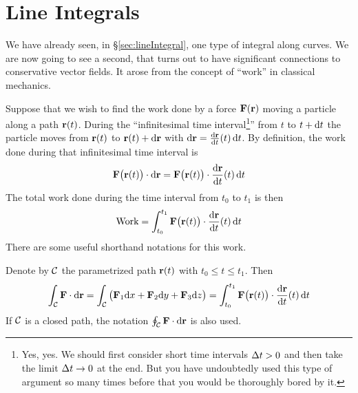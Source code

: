 \section{Line Integrals}\label{sec:workIntegrals}
We have already seen, in \S\ref{sec:lineIntegral}, one type of integral along
curves. We are now going to see a second, that turns out to have significant
connections to conservative vector fields. It arose from the concept of 
``work'' in classical mechanics. 

Suppose that we wish to find the work done
by a force $\mathbf{F}(\mathbf{r})$ moving a particle 
along a path $\mathbf{r}(t)$. During the ``infinitesimal time interval\footnote{Yes, yes. We should first consider short time intervals $\Delta t>0$ and then take the limit 
$\Delta t\rightarrow 0$ at the end. But you have undoubtedly used this 
type of argument so many times before that you would be thoroughly 
bored by it.}'' 
from $t$ to $t+\mathrm{d}t$  the particle moves from $\mathbf{r}(t)$ to $\mathbf{r}(t)+\mathrm{d}\mathbf{r}$ with $\dee{\vr}=\diff{\vr}{t}(t)\,\dee{t}$. By definition, the work done 
during that infinitesimal time interval is 
\begin{equation*}
\vF\big(\vr(t)\big)\cdot\dee{\vr} = \vF\big(\vr(t)\big)\cdot
\diff{\vr}{t}(t)\,\dee{t}
\end{equation*}
The total work done during the time interval from $t_0$ to $t_1$ is then
\begin{equation*}
\text{Work} = \int_{t_0}^{t_1}\vF\big(\vr(t)\big)\cdot\diff{\vr}{t}(t)\,\dee{t}
\end{equation*}
There are some useful shorthand notations for this work.

\begin{notn}\label{not:workIntegral}
Denote by $\mathcal{C}$ the parametrized path $\mathbf{r}(t)$ with $t_0\le t\le t_1$. 
Then
\begin{equation*}
\int_\cC\vF\cdot\dee{\vr}
=\int_\cC\big(\vF_1\dee{x}+\vF_2\dee{y}+\vF_3\dee{z}\big)
=\int_{t_0}^{t_1}\vF\big(\vr(t)\big)\cdot\diff{\vr}{t}(t)\,\dee{t}
\end{equation*}
If $\mathcal{C}$ is a closed path, the notation $\oint_{\mathcal{C}}\mathbf{F}\cdot\mathrm{d}\mathbf{r}$
is also used.
\end{notn}

